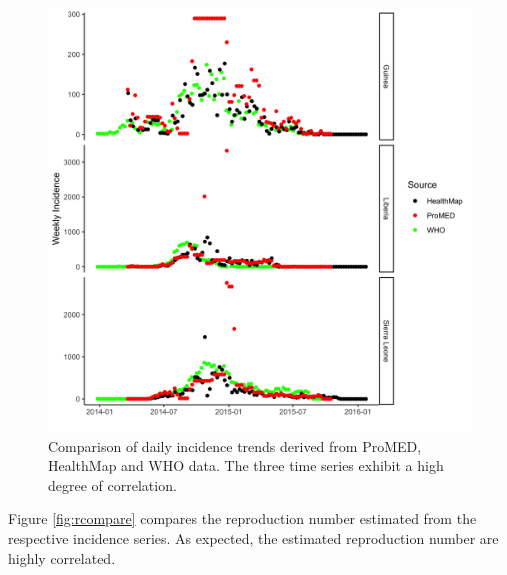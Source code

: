 \documentclass[]{article}
\begin{document}
\begin{figure}

{\centering \includegraphics[width=29.17in]{figures/who_promed_hm_incid} 

}

\caption{Comparison of daily incidence trends derived from ProMED, HealthMap and WHO data. The three time series exhibit a high degree of correlation.}\label{fig:incidcompare}
\end{figure}

Figure \ref{fig:rcompare} compares the reproduction number estimated
from the respective incidence series. As expected, the estimated
reproduction number are highly correlated.
\end{document}
